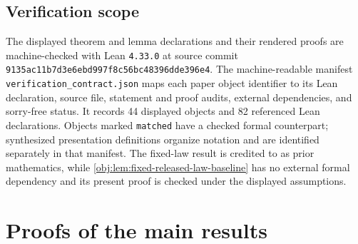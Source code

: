 \documentclass[11pt]{article}
\begin{document}
\subsection{Verification scope}

The displayed theorem and lemma declarations and their rendered proofs are machine-checked with Lean \texttt{4.33.0} at source commit \texttt{9135ac11b7d3e6ebd997f8c56bc48396dde396e4}. The machine-readable manifest \texttt{verification\_contract.json} maps each paper object identifier to its Lean declaration, source file, statement and proof audits, external dependencies, and sorry-free status. It records 44 displayed objects and 82 referenced Lean declarations. Objects marked \texttt{matched} have a checked formal counterpart; synthesized presentation definitions organize notation and are identified separately in that manifest. The fixed-law result is credited to \citet[Theorem 3.2 and eq. (3.1)]{FanShermanShum2014} as prior mathematics, while \cref{obj:lem:fixed-released-law-baseline} has no external formal dependency and its present proof is checked under the displayed assumptions.


\section{Proofs of the main results}\label{sec:deferred-proofs}
\end{document}
